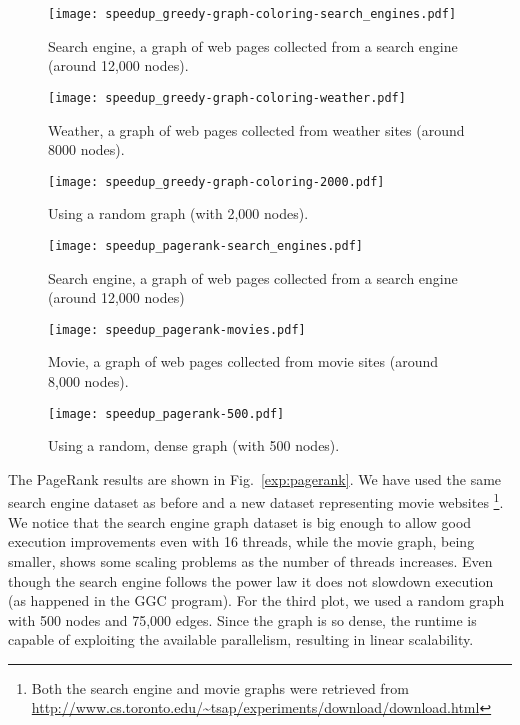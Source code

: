 \newcommand{\figsize}[0]{6.5cm}

\begin{figure*}[htp]
   \centering
   \begin{subfigure}[b]{0.3\textwidth}
      \texttt{[image: speedup\_greedy-graph-coloring-search\_engines.pdf]}
      \caption{Search engine, a graph of web pages collected from a search engine (around 12,000 nodes).}
   \end{subfigure}
   \begin{subfigure}[b]{0.3\textwidth}
      \texttt{[image: speedup\_greedy-graph-coloring-weather.pdf]}
      \caption{Weather, a graph of web pages collected from weather sites (around 8000 nodes).}
   \end{subfigure}
   \begin{subfigure}[b]{0.3\textwidth}
      \texttt{[image: speedup\_greedy-graph-coloring-2000.pdf]}
      \caption{Using a random graph (with 2,000 nodes).}
   \end{subfigure}
   \caption{Experimental results for the greedy GGC algorithm.}
   \label{exp:graph_coloring}
\end{figure*}

\begin{figure*}[htp]
   \centering
   \begin{subfigure}[b]{0.3\textwidth}
      \texttt{[image: speedup\_pagerank-search\_engines.pdf]}
      \caption{Search engine, a graph of web pages collected from a search engine (around 12,000 nodes)}
   \end{subfigure}
   \begin{subfigure}[b]{0.3\textwidth}
      \texttt{[image: speedup\_pagerank-movies.pdf]}
      \caption{Movie, a graph of web pages collected from movie sites (around 8,000 nodes).}
   \end{subfigure}
   \begin{subfigure}[b]{0.3\textwidth}
      \texttt{[image: speedup\_pagerank-500.pdf]}
      \caption{Using a random, dense graph (with 500 nodes).}
   \end{subfigure}
   \caption{Experimental results for the asynchronous PageRank algorithm.}
   \label{exp:pagerank}
\end{figure*}

The PageRank results are shown in Fig.~\ref{exp:pagerank}. We have used the same search engine dataset as before and a new dataset representing movie websites \footnote{Both the search engine and movie graphs were retrieved from \url{http://www.cs.toronto.edu/~tsap/experiments/download/download.html}}. We notice that the search engine graph dataset is big enough to allow good execution improvements even with 16 threads, while the movie graph, being smaller, shows some scaling problems as the number of threads increases. Even though the search engine follows the power law it does not slowdown execution (as happened in the GGC program).
For the third plot, we used a random graph with 500 nodes and 75,000 edges. Since the graph is so dense, the runtime is capable of exploiting the
available parallelism, resulting in linear scalability.

